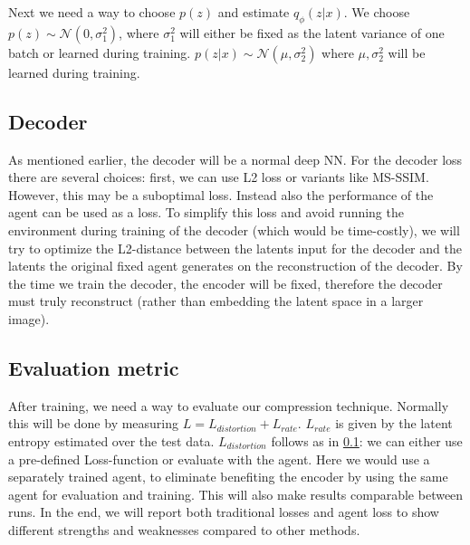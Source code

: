 \documentclass[a4paper]{scrartcl}
\begin{document}
        Next we need a way to choose $p(z)$ and estimate $q_\phi (z\vert x)$.
        We choose $p(z) \sim \mathcal{N}(0, \sigma_1^2)$, where $\sigma_1^2$ will
        either be fixed as the latent variance of one batch or learned during training. $p(z
        \vert x) \sim \mathcal{N}(\mu , \sigma_2^2)$ where $\mu, \sigma_2^2$ will be
        learned during training.

    \subsection{Decoder}\label{methods:Decoder}
        As mentioned earlier, the decoder will be a normal deep NN. For the decoder loss there are several
        choices: first, we can use L2 loss or variants like MS-SSIM. However, this may be a suboptimal loss. Instead
        also the performance of the agent can be used as a loss. To simplify
        this loss and avoid running the environment during training of the
        decoder (which would be time-costly), we will try to optimize the L2-distance between the latents input for
        the decoder and the latents the original fixed agent generates on the reconstruction of
        the decoder. By the time we train the decoder, the encoder will
        be fixed, therefore the decoder must truly reconstruct (rather than embedding the latent space in a larger image).

    \subsection{Evaluation metric}
        After training, we need a way to evaluate our compression technique.
        Normally this will be done by measuring $L = L_{distortion} + L_{rate}$.
        $L_{rate}$ is given by the latent entropy estimated over
        the test data. $L_{distortion}$ follows as in
        \ref{methods:Decoder}: we can either use a pre-defined Loss-function or evaluate with
        the agent. Here we would use a separately trained agent,
        to eliminate benefiting the encoder by using the same
        agent for evaluation and training. This will also make results
        comparable between runs. In the end, we will report both traditional
        losses and agent loss to show different strengths and weaknesses
        compared to other methods. 
        
\end{document}
